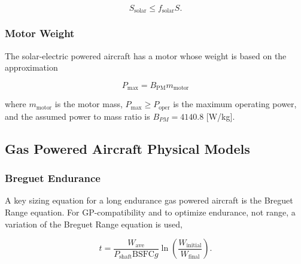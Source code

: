 \begin{equation}
    \label{e:solarssolar}
    S_{\text{solar}} \leq f_{\text{solar}}S.
\end{equation}

\subsubsection{Motor Weight}

The solar-electric powered aircraft has a motor whose weight is based on the approximation\cite{electricengine}

\begin{equation}
    \label{e:electricengine}
    P_{\text{max}} = B_{\text{PM}} m_{\text{motor}}
\end{equation}

where $m_{\text{motor}}$ is the motor mass, $P_{\text{max}} \geq P_{\text{oper}}$ is the maximum operating power, and the assumed power to mass ratio is $B_{PM} = 4140.8$ [W/kg]. \\

\subsection{Gas Powered Aircraft Physical Models}

\subsubsection{Breguet Endurance}

A key sizing equation for a long endurance gas powered aircraft is the Breguet Range equation.  
For GP-compatibility and to optimize endurance, not range, a variation of the Breguet Range equation is used, 

\begin{equation}
    \label{e:breguetendurance}
    t = \frac{W_{\text{ave}}}{P_{\text{shaft}}\text{BSFC}g} \ln{\left( \frac{W_{\text{initial}}}{W_{\text{final}}}\right)}.
\end{equation}

%
% 
% 
% 
% 

